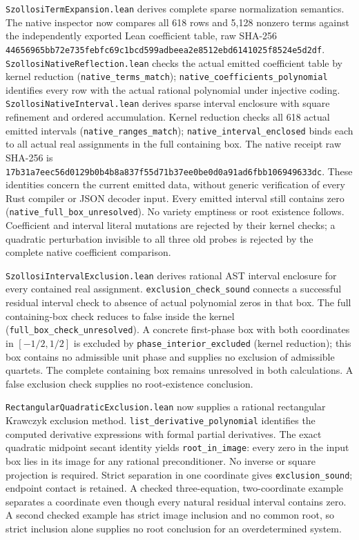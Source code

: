 \documentclass[
]{article}
\begin{document}
\nolinkurl{SzollosiTermExpansion.lean} derives complete sparse
normalization semantics. The native inspector now compares all 618 rows
and 5,128 nonzero terms against the independently exported Lean
coefficient table, raw SHA-256
\nolinkurl{44656965bb72e735febfc69c1bcd599adbeea2e8512ebd6141025f8524e5d2df}.
\nolinkurl{SzollosiNativeReflection.lean} checks the actual emitted
coefficient table by kernel reduction (\nolinkurl{native_terms_match});
\nolinkurl{native_coefficients_polynomial} identifies every row with the
actual rational polynomial under injective coding.
\nolinkurl{SzollosiNativeInterval.lean} derives sparse interval
enclosure with square refinement and ordered accumulation. Kernel
reduction checks all 618 actual emitted intervals
(\nolinkurl{native_ranges_match}); \nolinkurl{native_interval_enclosed}
binds each to all actual real assignments in the full containing box.
The native receipt raw SHA-256 is
\nolinkurl{17b31a7eec56d0129b0b4b8a837f55d71b37ee0be0d0a91ad6fbb106949633dc}.
These identities concern the current emitted data, without generic
verification of every Rust compiler or JSON decoder input. Every emitted
interval still contains zero (\nolinkurl{native_full_box_unresolved}).
No variety emptiness or root existence follows. Coefficient and interval
literal mutations are rejected by their kernel checks; a quadratic
perturbation invisible to all three old probes is rejected by the
complete native coefficient comparison.

\nolinkurl{SzollosiIntervalExclusion.lean} derives rational AST interval
enclosure for every contained real assignment.
\nolinkurl{exclusion_check_sound} connects a successful residual
interval check to absence of actual polynomial zeros in that box. The
full containing-box check reduces to false inside the kernel
(\nolinkurl{full_box_check_unresolved}). A concrete first-phase box with
both coordinates in \([-1/2,1/2]\) is excluded by
\nolinkurl{phase_interior_excluded} (kernel reduction); this box
contains no admissible unit phase and supplies no exclusion of
admissible quartets. The complete containing box remains unresolved in
both calculations. A false exclusion check supplies no root-existence
conclusion.

\nolinkurl{RectangularQuadraticExclusion.lean} now supplies a rational
rectangular Krawczyk exclusion method.
\nolinkurl{list_derivative_polynomial} identifies the computed
derivative expressions with formal partial derivatives. The exact
quadratic midpoint secant identity yields \nolinkurl{root_in_image}:
every zero in the input box lies in its image for any rational
preconditioner. No inverse or square projection is required. Strict
separation in one coordinate gives \nolinkurl{exclusion_sound}; endpoint
contact is retained. A checked three-equation, two-coordinate example
separates a coordinate even though every natural residual interval
contains zero. A second checked example has strict image inclusion and
no common root, so strict inclusion alone supplies no root conclusion
for an overdetermined system.
\end{document}
